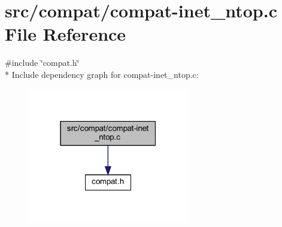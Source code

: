 \hypertarget{compat-inet__ntop_8c}{}\section{src/compat/compat-\/inet\+\_\+ntop.c File Reference}
\label{compat-inet__ntop_8c}
{\ttfamily \#include \char`\"{}compat.\+h\char`\"{}}\\*
Include dependency graph for compat-\/inet\+\_\+ntop.c\+:
\nopagebreak
\begin{figure}[H]
\begin{center}
\leavevmode
\includegraphics[width=199pt]{compat-inet__ntop_8c__incl}
\end{center}
\end{figure}
